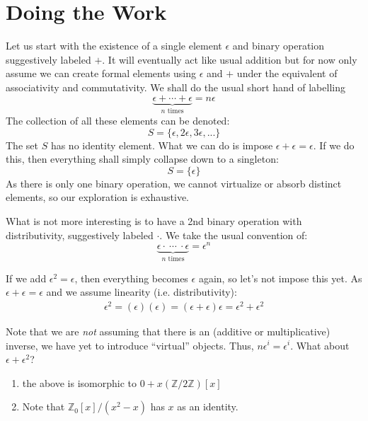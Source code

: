 \documentclass{article}
\newcommand{\Z}{{\mathbb{Z}}}
\begin{document}
\section{Doing the Work}

Let us start with the existence of a single element $\epsilon$ and binary operation suggestively labeled $+$.
It will eventually act like usual addition but for now only assume we can create formal elements using
$\epsilon$ and $+$ under the equivalent of associativity and commutativity. We shall do the usual short hand
of labelling
\[
  \underbrace{\epsilon+ \cdots + \epsilon}_{\text{$n$ times}} = n\epsilon
\]
The collection of all these elements can be denoted:
\[
  S =\{\epsilon, 2\epsilon, 3\epsilon, ...\}
\]
The set $S$ has no identity element. What we can do is impose $\epsilon + \epsilon = \epsilon$. If we do this,
then everything shall simply collapse down to a singleton:
\[
  S = \{\epsilon\}
\]
As there is only one binary operation, we cannot virtualize or absorb distinct elements, so our exploration is
exhaustive.

What is not more interesting is to have a 2nd binary operation with distributivity, suggestively labeled
$\cdot$. We take the usual convention of:
\[
  \underbrace{\epsilon\cdot\ \cdots\ \cdot \epsilon}_{\text{$n$ times}} = \epsilon^n
\]

If we add $\epsilon^2 = \epsilon$, then everything becomes $\epsilon$ again, so let's not impose
this yet. As $\epsilon+\epsilon=\epsilon$ and we assume linearity (i.e. distributivity):
\begin{align*}
 \epsilon^2 = (\epsilon)(\epsilon) = (\epsilon+\epsilon)\epsilon = \epsilon^2 + \epsilon^2
\end{align*}

Note that we are \emph{not} assuming that there is an (additive or multiplicative) inverse, we have yet to introduce ``virtual'' objects.
Thus, $n\epsilon^i = \epsilon^i$. What about $\epsilon + \epsilon^2$?


\begin{enumerate}
  \item the above is isomorphic to $0 + x(\Z/2\Z)[x]$
  \item Note that $\Z_0[x]/(x^2-x)$ has $x$ as an identity.
\end{enumerate}





\end{document}
